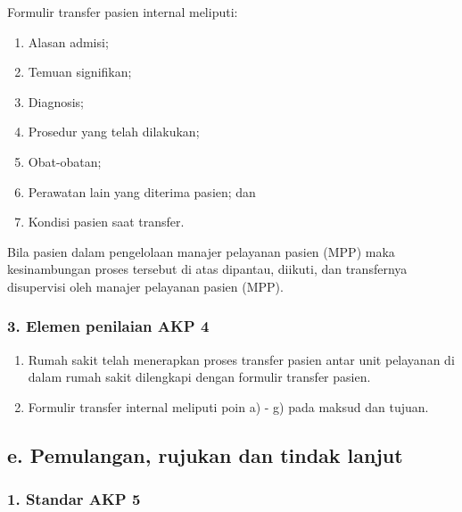 \documentclass[
]{book}
\providecommand{\tightlist}{%
  \setlength{\itemsep}{0pt}\setlength{\parskip}{0pt}}
\begin{document}
Formulir transfer pasien internal meliputi:

\begin{enumerate}
\def\labelenumi{\alph{enumi}.}
\tightlist
\item
  Alasan admisi;
\item
  Temuan signifikan;
\item
  Diagnosis;
\item
  Prosedur yang telah dilakukan;
\item
  Obat-obatan;
\item
  Perawatan lain yang diterima pasien; dan
\item
  Kondisi pasien saat transfer.
\end{enumerate}

Bila pasien dalam pengelolaan manajer pelayanan pasien (MPP) maka kesinambungan proses tersebut di atas dipantau, diikuti, dan transfernya disupervisi oleh manajer pelayanan pasien (MPP).

\hypertarget{elemen-penilaian-akp-4}{%
\subsubsection*{3. Elemen penilaian AKP 4}\label{elemen-penilaian-akp-4}}

\begin{enumerate}
\def\labelenumi{\alph{enumi}.}
\tightlist
\item
  Rumah sakit telah menerapkan proses transfer pasien antar unit pelayanan di dalam rumah sakit dilengkapi dengan formulir transfer pasien.
\item
  Formulir transfer internal meliputi poin a) - g) pada maksud dan tujuan.
\end{enumerate}

\hypertarget{e.-pemulangan-rujukan-dan-tindak-lanjut}{%
\subsection*{e. Pemulangan, rujukan dan tindak lanjut}\label{e.-pemulangan-rujukan-dan-tindak-lanjut}}

\hypertarget{standar-akp-5}{%
\subsubsection*{1. Standar AKP 5}\label{standar-akp-5}}
\end{document}
